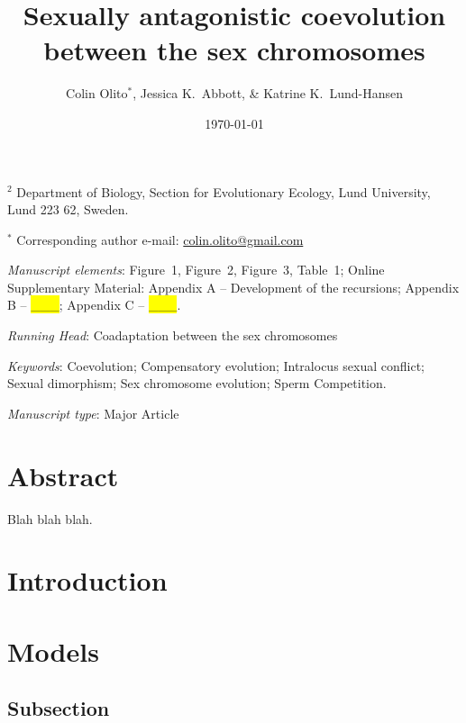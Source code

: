 \documentclass{article}
\title{Sexually antagonistic coevolution between the sex chromosomes}
\author{Colin Olito$^{\ast}$, Jessica K.~Abbott, \& Katrine K.~Lund-Hansen}
\date{\today}
\begin{document}
\maketitle

\noindent{} $^{2}$ Department of Biology, Section for Evolutionary Ecology, Lund University, Lund 223 62, Sweden.

\noindent{} $^{\ast}$ Corresponding author e-mail: \url{colin.olito@gmail.com}

\bigskip

\noindent{} \textit{Manuscript elements}: Figure~1, Figure~2, Figure~3, Table~1; Online Supplementary Material: Appendix A -- Development of the recursions; Appendix B -- \hl{___}; Appendix C -- \hl{___}.

\bigskip
\noindent{} \textit{Running Head}: Coadaptation between the sex chromosomes

\bigskip

\noindent{} \textit{Keywords}: Coevolution; Compensatory evolution; Intralocus sexual conflict;  Sexual dimorphism; Sex chromosome evolution; Sperm Competition.

\bigskip

\noindent{} \textit{Manuscript type}: Major Article

\bigskip


\linenumbers
\modulolinenumbers[1]
\renewcommand\linenumberfont{\normalfont\small}


\newpage{}
\section*{Abstract}

\noindent{} Blah blah blah.
\newpage{}


\section*{Introduction}


\section*{Models} \label{sec:Models}



\subsection*{Subsection}
\end{document}
